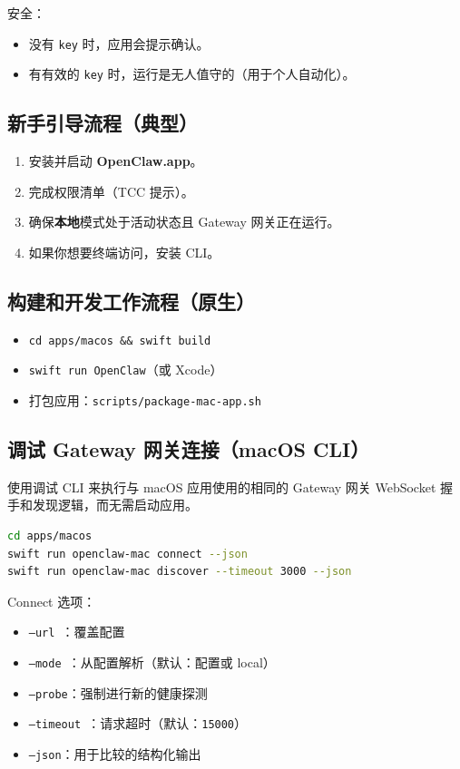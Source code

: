 安全：

\begin{itemize}
  \item 没有 \texttt{key} 时，应用会提示确认。
  \item 有有效的 \texttt{key} 时，运行是无人值守的（用于个人自动化）。
\end{itemize}


\subsection{新手引导流程（典型）}


\begin{enumerate}
  \item 安装并启动 \textbf{OpenClaw.app}。
  \item 完成权限清单（TCC 提示）。
  \item 确保\textbf{本地}模式处于活动状态且 Gateway 网关正在运行。
  \item 如果你想要终端访问，安装 CLI。
\end{enumerate}


\subsection{构建和开发工作流程（原生）}


\begin{itemize}
  \item \texttt{cd apps/macos \&\& swift build}
  \item \texttt{swift run OpenClaw}（或 Xcode）
  \item 打包应用：\texttt{scripts/package-mac-app.sh}
\end{itemize}


\subsection{调试 Gateway 网关连接（macOS CLI）}


使用调试 CLI 来执行与 macOS 应用使用的相同的 Gateway 网关 WebSocket 握手和发现逻辑，而无需启动应用。

\begin{lstlisting}[language=bash]
cd apps/macos
swift run openclaw-mac connect --json
swift run openclaw-mac discover --timeout 3000 --json
\end{lstlisting}


Connect 选项：

\begin{itemize}
  \item \texttt{--url }：覆盖配置
  \item \texttt{--mode }：从配置解析（默认：配置或 local）
  \item \texttt{--probe}：强制进行新的健康探测
  \item \texttt{--timeout }：请求超时（默认：\texttt{15000}）
  \item \texttt{--json}：用于比较的结构化输出
\end{itemize}


